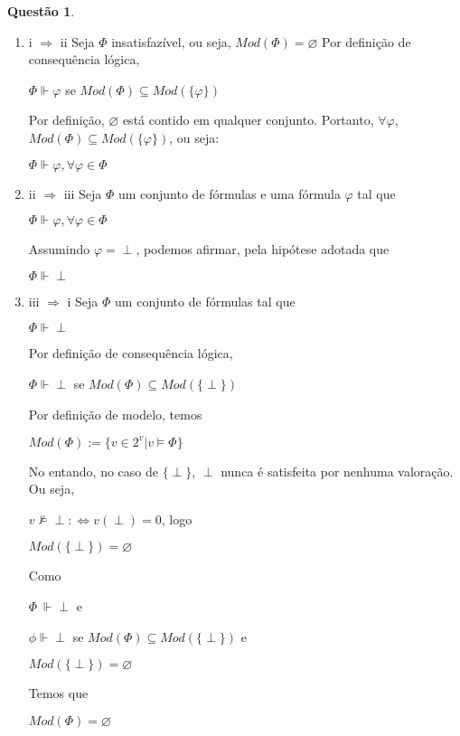 \documentclass[tikz,border=5]{article}
\theoremstyle{definition}
\newtheorem{exerc}{Questão}
\begin{document}
	\begin{exerc}
	    $ $
	    \begin{enumerate}
	    	\item i $\Rightarrow$ ii \newline Seja $\Phi$ insatisfazível, ou seja, $Mod(\Phi) = \varnothing$ \newline Por definição de consequência lógica,
	    	\begin{center} $\Phi \Vdash \varphi$ se $Mod(\Phi) \subseteq Mod(\{\varphi\})$ \end{center} Por definição, $\varnothing$ está contido em qualquer conjunto. \newline Portanto, $\forall \varphi$, $Mod(\Phi) \subseteq Mod(\{\varphi\})$, ou seja: \begin{center} $\Phi \Vdash \varphi, \forall \varphi \in \Phi$  \end{center}

	        \item ii $\Rightarrow$ iii \newline Seja $\Phi$ um conjunto de fórmulas e uma fórmula $\varphi$ tal que \begin{center}$\Phi \Vdash \varphi, \forall \varphi \in \Phi$ \end{center} Assumindo $\varphi = \perp$, podemos afirmar, pela hipótese adotada que \begin{center} $\Phi \Vdash \perp$ \end{center} 
	        
	        \item iii $\Rightarrow$ i \newline Seja $\Phi$ um conjunto de fórmulas tal que \begin{center} $\Phi \Vdash \perp$ \end{center} Por definição de consequência lógica, \begin{center} $\Phi \Vdash \perp$ se $Mod(\Phi) \subseteq Mod(\{\perp\})$ \end{center} Por definição de modelo, temos \begin{center} $Mod(\Phi) := \{v \in 2^{v} |v \vDash \Phi\}$ \end{center} No entando, no caso de $\{\perp\}$, $\perp$ nunca é satisfeita por nenhuma valoração. Ou seja, \begin{center} $v \nvDash \perp :\Leftrightarrow v(\perp) = 0$, logo\end{center}\begin{center} $Mod(\{\perp\}) = \varnothing$ \end{center} Como \begin{center} $\Phi\ \Vdash\perp$ e \end{center} \begin{center}$\phi\Vdash\perp$ se $Mod(\Phi) \subseteq Mod(\{\perp\})$ e \end{center}\begin{center} $Mod(\{\perp\}) = \varnothing$ \end{center} Temos que \begin{center} $Mod(\Phi) = \varnothing$ \end{center}
	    \end{enumerate}
	\end{exerc}
\end{document}
